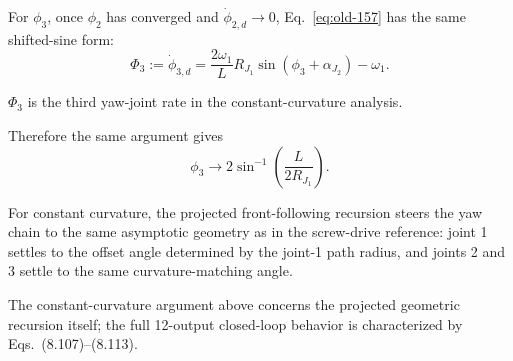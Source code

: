 \documentclass[12pt,a4paper]{report}
\newcommand{\newsymbols}[1]{\par\noindent{}#1\par\vspace{0.35em}}
\newcommand{\formulaannotation}[1]{\par\noindent{}#1\par\vspace{0.35em}}
\begin{document}
For $\phi_3$, once $\phi_2$ has converged and $\dot{\phi}_{2,d} \to 0$, Eq.~\eqref{eq:old-157} has the same shifted-sine form:
\begin{equation}
\Phi_3 := \dot{\phi}_{3,d}
= \frac{2\omega_1}{L}R_{J_1}\sin(\phi_3 + \alpha_{J_2}) - \omega_1.
\end{equation}
\newsymbols{$\Phi_3$ is the third yaw-joint rate in the constant-curvature analysis.}
Therefore the same argument gives
\begin{equation}
\phi_3 \to 2\sin^{-1}\!\left(\frac{L}{2R_{J_1}}\right).
\end{equation}
\formulaannotation{For constant curvature, the projected front-following recursion steers the yaw chain to the same asymptotic geometry as in the screw-drive reference: joint 1 settles to the offset angle determined by the joint-1 path radius, and joints 2 and 3 settle to the same curvature-matching angle.}
The constant-curvature argument above concerns the projected geometric recursion itself; the full 12-output closed-loop behavior is characterized by Eqs.~(8.107)--(8.113).
\end{document}
